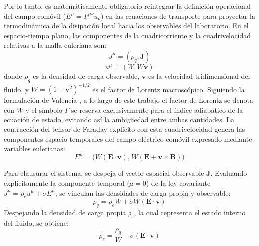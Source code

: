 Por lo tanto, es matemáticamente obligatorio reintegrar la definición operacional del campo comóvil ($E^\mu = F^{\mu\nu}u_\nu$) en las ecuaciones de transporte para proyectar la termodinámica de la disipación local hacia los observables del laboratorio. En el espacio-tiempo plano, las componentes de la cuadricorriente y la cuadrivelocidad relativas a la malla euleriana son:
\begin{equation}
    J^\mu = (\rho_q, \mathbf{J})
\end{equation}
\begin{equation}
    u^\mu = (W, W \mathbf{v})
\end{equation}
donde $\rho_q$ es la densidad de carga observable, $\mathbf{v}$ es la velocidad tridimensional del fluido, y $W = (1 - \mathbf{v}^2)^{-1/2}$ es el factor de Lorentz macroscópico. Siguiendo la formulación de Valencia \parencite{rezzolla-2013}, a lo largo de este trabajo el factor de Lorentz se denota con $W$ y el símbolo $\Gamma$ se reserva exclusivamente para el índice adiabático de la ecuación de estado, evitando así la ambigüedad entre ambas cantidades. La contracción del tensor de Faraday explícito con esta cuadrivelocidad genera las componentes espacio-temporales del campo eléctrico comóvil expresado mediante variables eulerianas:
\begin{equation}
    E^\mu = \Big( W (\mathbf{E} \cdot \mathbf{v}), \, W (\mathbf{E} + \mathbf{v} \times \mathbf{B}) \Big)
\end{equation}

Para clausurar el sistema, se despeja el vector espacial observable $\mathbf{J}$. Evaluando explícitamente la componente temporal ($\mu=0$) de la ley covariante $J^\mu = \rho_e u^\mu + \sigma E^\mu$, se vinculan las densidades de carga propia y observable:
\begin{equation}
    \rho_q = \rho_e W + \sigma W (\mathbf{E} \cdot \mathbf{v})
\end{equation}
Despejando la densidad de carga propia $\rho_e$, la cual representa el estado interno del fluido, se obtiene:
\begin{equation}
    \rho_e = \frac{\rho_q}{W} - \sigma (\mathbf{E} \cdot \mathbf{v})
\end{equation}

